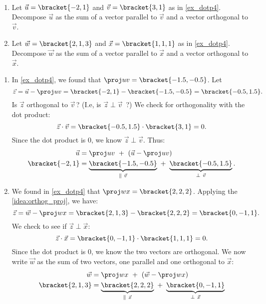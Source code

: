 \begin{example}\label{ex_dotp5}%
\mbox{}\\[-2\baselineskip]\parbox[t]{\linewidth}{%
\begin{enumerate}
	\item Let $\vec u =\bracket{-2,1}$ and $\vec v =\bracket{3,1}$ as in \autoref{ex_dotp4}. Decompose $\vec u$ as the sum of a vector parallel to $\vec v$ and a vector orthogonal to $\vec v$.
	\item	Let $\vec w =\bracket{2,1,3}$ and $\vec x  =\bracket{1,1,1}$ as in \autoref{ex_dotp4}. Decompose $\vec w$ as the sum of a vector parallel to $\vec x$ and a vector orthogonal to $\vec x$.
\end{enumerate}}\vspace{0pt}
\solution
\begin{enumerate}
	\item In \autoref{ex_dotp4}, we found that $\proj uv =\bracket{-1.5,-0.5}$. Let
	\[\vec z = \vec u - \proj uv =\bracket{-2,1}-\bracket{-1.5,-0.5}=\bracket{-0.5, 1.5}.\]
	Is $\vec z$ orthogonal to $\vec v$\,? (I.e, is $\vec z \perp\vec v$\ ?) We check for orthogonality with the dot product:
	\[\vec z\cdot\vec v =\bracket{-0.5,1.5}\cdot\bracket{3,1}=0.\]
	Since the dot product is 0, we know $\vec z \perp \vec v$. Thus:
	\begin{align*}
	\vec u &= \proj uv\ +\ (\vec u - \proj uv) \\
	\bracket{-2,1}&= \underbrace{\bracket{-1.5,-0.5}}_{\parallel\ \vec v}\ +\ \underbrace{\bracket{-0.5,1.5}}_{\perp \ \vec v}.
	\end{align*}
	
	\item	We found in \autoref{ex_dotp4} that $\proj wx =\bracket{2,2,2}$. Applying the \autoref{idea:orthog_proj}, we have:
	\[\vec z = \vec w - \proj wx =\bracket{2,1,3}-\bracket{2,2,2}=\bracket{0,-1,1}.\] We check to see if $\vec z \perp \vec x$:
	\[\vec z\cdot\vec x =\bracket{0,-1,1}\cdot\bracket{1,1,1}= 0.\]
	Since the dot product is 0, we know the two vectors are orthogonal.
	We now write $\vec w$ as the sum of two vectors, one parallel and one orthogonal to $\vec x$:
	\begin{align*}
	\vec w &= \proj wx\ +\ (\vec w - \proj wx) \\
	\bracket{2,1,3}&= \underbrace{\bracket{2,2,2}}_{\parallel\ \vec x}\ +\ \underbrace{\bracket{0,-1,1}}_{\perp \ \vec x}
	\end{align*}
\end{enumerate}
\end{example}

